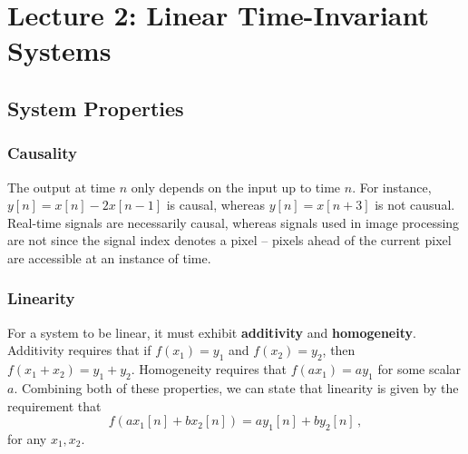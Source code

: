 \section{Lecture 2: Linear Time-Invariant Systems}

\subsection{System Properties}
%
\subsubsection{Causality}
%
The output at time $n$ only depends on the input up to time $n$. For instance,
$y[n] = x[n] - 2x[n-1]$ is causal, whereas $y[n] = x[n+3]$ is not causual.
Real-time signals are necessarily causal, whereas signals used in image processing
are not since the signal index denotes a pixel -- pixels ahead of the current
pixel are accessible at an instance of time.

\subsubsection{Linearity}
%
For a system to be linear, it must exhibit \textbf{additivity} and
\textbf{homogeneity}. Additivity requires that if $f(x_1) = y_1$ and
$f(x_2) = y_2$, then $f(x_1 + x_2) = y_1 + y_2$. Homogeneity requires that
$f(ax_1) = ay_1$ for some scalar $a$. Combining both of these properties, we can
state that linearity is given by the requirement that
%
\begin{displaymath}
  f(ax_1[n] + bx_2[n]) = ay_1[n] + by_2[n] \,,
\end{displaymath}
%
for any $x_1,x_2$.

